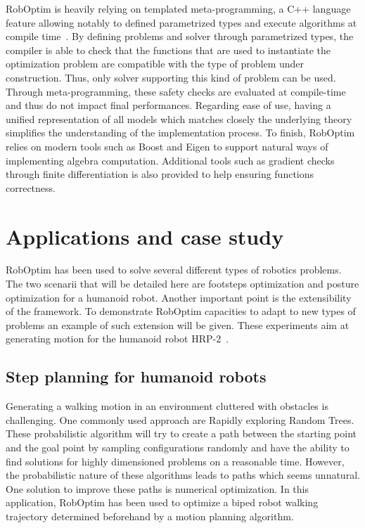 \documentclass[conference,final,a4paper,twocolumn,9pt]{IEEEtran}
\begin{document}
RobOptim is heavily relying on templated meta-programming, a C++
language feature allowing notably to defined parametrized types and
execute algorithms at compile time~\cite{iso14882}. By defining
problems and solver through parametrized types, the compiler is able
to check that the functions that are used to instantiate the
optimization problem are compatible with the type of problem under
construction. Thus, only solver supporting this kind of problem can be
used. Through meta-programming, these safety checks are evaluated at
compile-time and thus do not impact final performances. Regarding ease
of use, having a unified representation of all models which matches
closely the underlying theory simplifies the understanding of the
implementation process.  To finish, RobOptim relies on modern tools
such as Boost and Eigen to support natural ways of implementing
algebra computation. Additional tools such as gradient checks through
finite differentiation is also provided to help ensuring functions
correctness.


\section{Applications and case study}\label{sec:application}


RobOptim has been used to solve several different types of robotics
problems. The two scenarii that will be detailed here are footsteps
optimization and posture optimization for a humanoid robot. Another
important point is the extensibility of the framework. To demonstrate
RobOptim capacities to adapt to new types of problems an example of
such extension will be given. These experiments aim at generating
motion for the humanoid robot HRP-2~\cite{hrp2}.


\subsection{Step planning for humanoid robots}


Generating a walking motion in an environment cluttered with obstacles
is challenging. One commonly used approach are Rapidly exploring
Random Trees. These probabilistic algorithm will try to create a path
between the starting point and the goal point by sampling
configurations randomly and have the ability to find solutions for
highly dimensioned problems on a reasonable time. However, the
probabilistic nature of these algorithms leads to paths which seems
unnatural. One solution to improve these paths is numerical
optimization. In this application, RobOptim has been used to optimize
a biped robot walking trajectory determined beforehand by a motion
planning algorithm.
\end{document}
